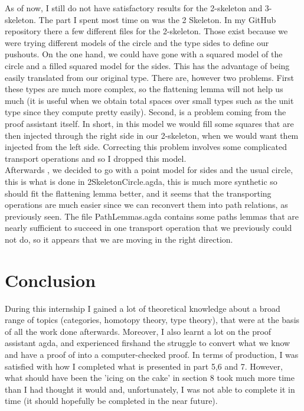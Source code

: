 \documentclass{report}
\begin{document}
As of now, I still do not have satisfactory results for the 2-skeleton and 3-skeleton. The part I spent most time on was the 2 Skeleton. In my GitHub repository there a few different files for the 2-skeleton. Those exist because we were trying different models of the circle and the type $\mathrm{sides}$ to define our pushouts. On the one hand, we could have gone with a squared model of the circle and a filled squared model for the sides. This has the advantage of being easily translated from our original type. There are, however two problems. First these types are much more complex, so the flattening lemma will not help us much (it is useful when we obtain total spaces over small types such as the unit type since they compute pretty easily). Second, is a problem coming from the proof assistant itself. In short, in this model we would fill some squares that are then injected through the right side in our 2-skeleton, when we would want them injected from the left side. Correcting this problem involves some complicated transport operations and so I dropped this model.\\
Afterwards , we decided to go with a point model for sides and the usual circle, this is what is done in 2SkeletonCircle.agda, this is much more synthetic so should fit the flattening lemma better, and it seems that the transporting operations are much easier since we can reconvert them into path relations, as previously seen. The file PathLemmas.agda contains some paths lemmas that are nearly sufficient to succeed in one transport operation that we previously could not do, so it appears that we are moving in the right direction.\\
\section*{Conclusion} 
During this internship I gained a lot of theoretical knowledge about a broad range of topics (categories, homotopy theory, type theory), that were at the basis of all the work done afterwards. Moreover, I also learnt a lot on the proof assistant agda, and experienced firshand the struggle to convert what we know and have a proof of into a computer-checked proof. In terms of production, I was satisfied with how I completed what is presented in part 5,6 and 7. However, what should have been the 'icing on the cake' in section 8 took much more time than I had thought it would and, unfortunately, I was not able to complete it in time (it should hopefully be completed in the near future).
\renewcommand\bibname{Bibliography and links}
\printbibliography
\end{document}
